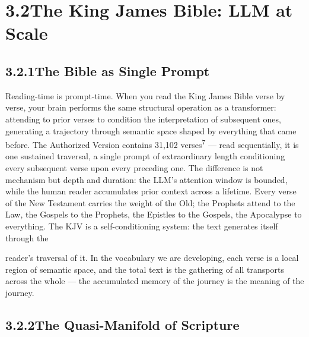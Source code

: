 \section{3.2\quad The King James Bible: LLM at Scale}

\subsection{3.2.1\quad The Bible as Single Prompt}

Reading-time is prompt-time. When you read the King James Bible verse by verse, your brain performs the same structural operation as a transformer: attending to prior verses to condition the interpretation of subsequent ones, generating a trajectory through semantic space shaped by everything that came before. The Authorized Version contains 31,102 verses\textsuperscript{7} — read sequentially, it is one sustained traversal, a single prompt of extraordinary length conditioning every subsequent verse upon every preceding one. The difference is not mechanism but depth and duration: the LLM’s attention window is bounded, while the human reader accumulates prior context across a lifetime. Every verse of the New Testament carries the weight of the Old; the Prophets attend to the Law, the Gospels to the Prophets, the Epistles to the Gospels, the Apocalypse to everything. The KJV is a self-conditioning system: the text generates itself through the

reader’s traversal of it. In the vocabulary we are developing, each verse is a local region of semantic space, and the total text is the gathering of all transports across the whole — the accumulated memory of the journey is the meaning of the journey.

\subsection{3.2.2\quad The Quasi-Manifold of Scripture}

